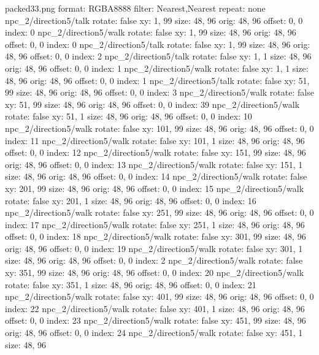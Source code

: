 packed33.png
format: RGBA8888
filter: Nearest,Nearest
repeat: none
npc_2/direction5/talk
  rotate: false
  xy: 1, 99
  size: 48, 96
  orig: 48, 96
  offset: 0, 0
  index: 0
npc_2/direction5/walk
  rotate: false
  xy: 1, 99
  size: 48, 96
  orig: 48, 96
  offset: 0, 0
  index: 0
npc_2/direction5/talk
  rotate: false
  xy: 1, 99
  size: 48, 96
  orig: 48, 96
  offset: 0, 0
  index: 2
npc_2/direction5/talk
  rotate: false
  xy: 1, 1
  size: 48, 96
  orig: 48, 96
  offset: 0, 0
  index: 1
npc_2/direction5/walk
  rotate: false
  xy: 1, 1
  size: 48, 96
  orig: 48, 96
  offset: 0, 0
  index: 1
npc_2/direction5/talk
  rotate: false
  xy: 51, 99
  size: 48, 96
  orig: 48, 96
  offset: 0, 0
  index: 3
npc_2/direction5/walk
  rotate: false
  xy: 51, 99
  size: 48, 96
  orig: 48, 96
  offset: 0, 0
  index: 39
npc_2/direction5/walk
  rotate: false
  xy: 51, 1
  size: 48, 96
  orig: 48, 96
  offset: 0, 0
  index: 10
npc_2/direction5/walk
  rotate: false
  xy: 101, 99
  size: 48, 96
  orig: 48, 96
  offset: 0, 0
  index: 11
npc_2/direction5/walk
  rotate: false
  xy: 101, 1
  size: 48, 96
  orig: 48, 96
  offset: 0, 0
  index: 12
npc_2/direction5/walk
  rotate: false
  xy: 151, 99
  size: 48, 96
  orig: 48, 96
  offset: 0, 0
  index: 13
npc_2/direction5/walk
  rotate: false
  xy: 151, 1
  size: 48, 96
  orig: 48, 96
  offset: 0, 0
  index: 14
npc_2/direction5/walk
  rotate: false
  xy: 201, 99
  size: 48, 96
  orig: 48, 96
  offset: 0, 0
  index: 15
npc_2/direction5/walk
  rotate: false
  xy: 201, 1
  size: 48, 96
  orig: 48, 96
  offset: 0, 0
  index: 16
npc_2/direction5/walk
  rotate: false
  xy: 251, 99
  size: 48, 96
  orig: 48, 96
  offset: 0, 0
  index: 17
npc_2/direction5/walk
  rotate: false
  xy: 251, 1
  size: 48, 96
  orig: 48, 96
  offset: 0, 0
  index: 18
npc_2/direction5/walk
  rotate: false
  xy: 301, 99
  size: 48, 96
  orig: 48, 96
  offset: 0, 0
  index: 19
npc_2/direction5/walk
  rotate: false
  xy: 301, 1
  size: 48, 96
  orig: 48, 96
  offset: 0, 0
  index: 2
npc_2/direction5/walk
  rotate: false
  xy: 351, 99
  size: 48, 96
  orig: 48, 96
  offset: 0, 0
  index: 20
npc_2/direction5/walk
  rotate: false
  xy: 351, 1
  size: 48, 96
  orig: 48, 96
  offset: 0, 0
  index: 21
npc_2/direction5/walk
  rotate: false
  xy: 401, 99
  size: 48, 96
  orig: 48, 96
  offset: 0, 0
  index: 22
npc_2/direction5/walk
  rotate: false
  xy: 401, 1
  size: 48, 96
  orig: 48, 96
  offset: 0, 0
  index: 23
npc_2/direction5/walk
  rotate: false
  xy: 451, 99
  size: 48, 96
  orig: 48, 96
  offset: 0, 0
  index: 24
npc_2/direction5/walk
  rotate: false
  xy: 451, 1
  size: 48, 96
